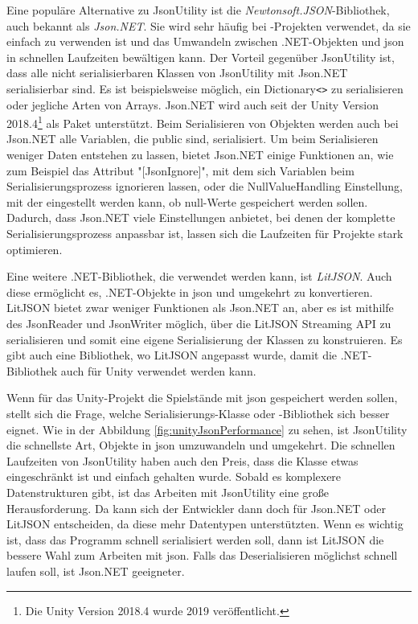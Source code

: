 Eine populäre Alternative zu JsonUtility ist die \textit{Newtonsoft.JSON}-Bibliothek, auch bekannt als \textit{Json.NET}. Sie wird sehr häufig bei \csharp{}-Projekten verwendet, da sie einfach zu verwenden ist und das Umwandeln zwischen .NET-Objekten und \ac{json} in schnellen Laufzeiten bewältigen kann.\cite{newtonsoftJsonNETNewtonsoft} Der Vorteil gegenüber JsonUtility ist, dass alle nicht serialisierbaren Klassen von JsonUtility mit Json.NET serialisierbar sind. Es ist beispielsweise möglich, ein Dictionary\texttt{<>} zu serialisieren\cite{newtonsoftSerializeDictionary}\cite{newtonsoftDeserializeDictionary} oder jegliche Arten von Arrays. Json.NET wird auch seit der Unity Version 2018.4\footnote{Die Unity Version 2018.4 wurde 2019 veröffentlicht.\cite{unityDownloadArchive}} als Paket unterstützt.\cite{NewtonsoftJsonUnitySupport} Beim Serialisieren von Objekten werden auch bei Json.NET alle Variablen, die public sind, serialisiert. Um beim Serialisieren weniger Daten entstehen zu lassen, bietet Json.NET einige Funktionen an, wie zum Beispiel das Attribut "[JsonIgnore]", mit dem sich Variablen beim Serialisierungsprozess ignorieren lassen, oder die NullValueHandling Einstellung, mit der eingestellt werden kann, ob null-Werte gespeichert werden sollen. Dadurch, dass Json.NET viele Einstellungen anbietet, bei denen der komplette Serialisierungsprozess anpassbar ist, lassen sich die Laufzeiten für Projekte stark optimieren.\cite{newtonsoftReducingSerialized}\cite{newtonsoftPerformanceTips}

Eine weitere .NET-Bibliothek, die verwendet werden kann, ist \textit{LitJSON}. Auch diese ermöglicht es, .NET-Objekte in \ac{json} und umgekehrt zu konvertieren.\cite{litjsonLitJSONDocumentation} LitJSON bietet zwar weniger Funktionen als Json.NET an, aber es ist mithilfe des JsonReader und JsonWriter möglich, über die LitJSON Streaming API zu serialisieren und somit eine eigene Serialisierung der Klassen zu konstruieren.\cite{litjsonLitJSONReaders} Es gibt auch eine Bibliothek, wo LitJSON angepasst wurde, damit die .NET-Bibliothek auch für Unity verwendet werden kann.\cite{githubGitHubMervillUnityLitJson}

Wenn für das Unity-Projekt die Spielstände mit \ac{json} gespeichert werden sollen, stellt sich die Frage, welche Serialisierungs-Klasse oder -Bibliothek sich besser eignet. Wie in der Abbildung \ref{fig:unityJsonPerformance} zu sehen, ist JsonUtility die schnellste Art, Objekte in \ac{json} umzuwandeln und umgekehrt. Die schnellen Laufzeiten von JsonUtility haben auch den Preis, dass die Klasse etwas eingeschränkt ist und einfach gehalten wurde. Sobald es komplexere Datenstrukturen gibt, ist das Arbeiten mit JsonUtility eine große Herausforderung. Da kann sich der Entwickler dann doch für Json.NET oder LitJSON entscheiden, da diese mehr Datentypen unterstützten. Wenn es wichtig ist, dass das Programm schnell serialisiert werden soll, dann ist LitJSON die bessere Wahl zum Arbeiten mit \ac{json}. Falls das Deserialisieren möglichst schnell laufen soll, ist Json.NET geeigneter.


